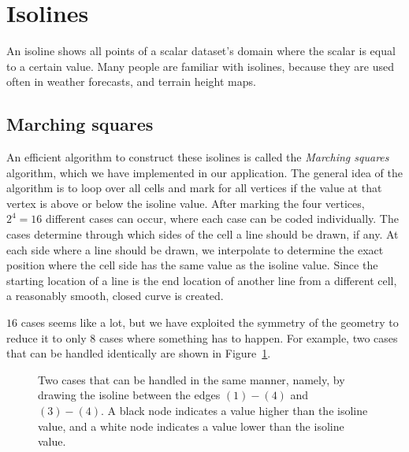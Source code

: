 \section{Isolines}
\label{sec:isolines}
An isoline shows all points of a scalar dataset's domain where the scalar is equal to a certain value.
Many people are familiar with isolines, because they are used often in weather forecasts, and terrain height maps.

\subsection{Marching squares}
An efficient algorithm to construct these isolines is called the \textit{Marching squares}\cite{maple2003geometric} algorithm, which we have implemented in our application.
The general idea of the algorithm is to loop over all cells and mark for all vertices if the value at that vertex is above or below the isoline value.
After marking the four vertices, \(2^4=16\) different cases can occur, where each case can be coded individually.
The cases determine through which sides of the cell a line should be drawn, if any.
At each side where a line should be drawn, we interpolate to determine the exact position where the cell side has the same value as the isoline value.
Since the starting location of a line is the end location of another line from a different cell, a reasonably smooth, closed curve is created.

\(16\) cases seems like a lot, but we have exploited the symmetry of the geometry to reduce it to only \(8\) cases where something has to happen.
For example, two cases that can be handled identically are shown in Figure~\ref{fig:iso_example}.
\begin{figure}[htb]
    \centering
    \caption{Two cases that can be handled in the same manner, namely, by drawing the isoline between the edges \((1)-(4)\) and \((3)-(4)\). A black node indicates a value higher than the isoline value, and a white node indicates a value lower than the isoline value.}
    \label{fig:iso_example}
\end{figure}

